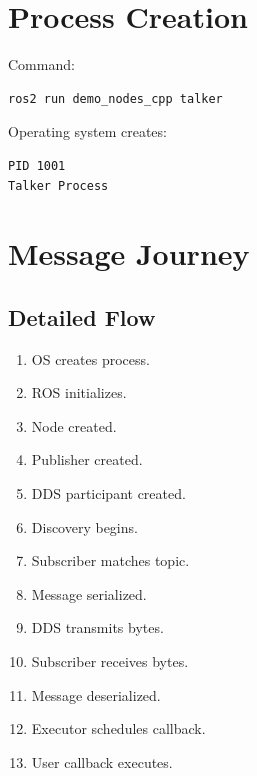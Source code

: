 \documentclass[11pt,oneside]{book}
\begin{document}
\chapter{Process Creation}

Command:

\begin{lstlisting}[language=bash]
ros2 run demo_nodes_cpp talker
\end{lstlisting}

Operating system creates:

\begin{verbatim}
PID 1001
Talker Process
\end{verbatim}

\chapter{Message Journey}

\begin{center}
\end{center}

\section{Detailed Flow}

\begin{enumerate}
\item OS creates process.
\item ROS initializes.
\item Node created.
\item Publisher created.
\item DDS participant created.
\item Discovery begins.
\item Subscriber matches topic.
\item Message serialized.
\item DDS transmits bytes.
\item Subscriber receives bytes.
\item Message deserialized.
\item Executor schedules callback.
\item User callback executes.
\end{enumerate}
\end{document}
